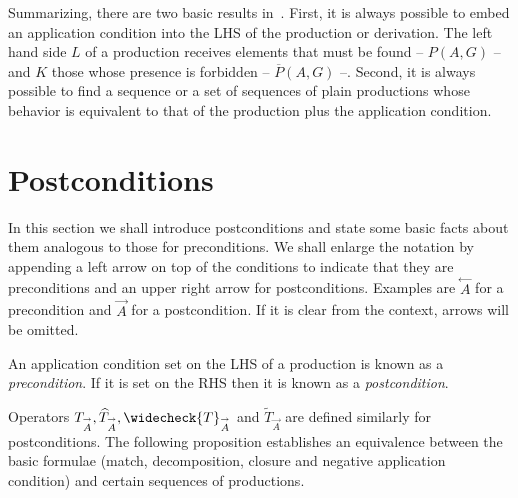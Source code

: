 \documentclass{fundam}
\begin{document}
Summarizing, there are two basic results
in~\cite{MGGfundamenta}. First, it is always possible to embed an
application condition into the LHS of the production or
derivation. The left hand side $L$ of a production receives elements
that must be found -- $P(A,G)$ -- and $K$ those whose presence is
forbidden -- $\overline{P}(A,G)$ --. Second, it is always possible to
find a sequence or a set of sequences of plain productions whose
behavior is equivalent to that of the production plus the application
condition.

\section{Postconditions}
\label{sec:postconditions}


In this section we shall introduce postconditions and state some basic
facts about them analogous to those for preconditions. We shall
enlarge the notation by appending a left arrow on top of the
conditions to indicate that they are preconditions and an upper
right arrow for postconditions.  Examples are
$\stackrel{\leftarrow}{A}$ for a precondition and
$\stackrel{\rightarrow}{A}$ for a postcondition.  If it is clear
from the context, arrows will be omitted.

\begin{definition}
  \label{def:prePostCondition}
  An application condition set on the LHS of a production is known as
  a \emph{precondition}. If it is set on the RHS then it is known as a
  \emph{postcondition}.
\end{definition}

Operators $T_{\stackrel{\rightarrow}{A}},
\widehat{T}_{\stackrel{\rightarrow}{A}},
\widecheck{T}_{\stackrel{\rightarrow}{A}}$ and
$\widetilde{T}_{\stackrel{\rightarrow}{A}}$ are defined similarly for
postconditions. The following proposition establishes an
equivalence between the basic formulae (match, decomposition, closure
and negative application condition) and certain sequences of
productions.
\end{document}
